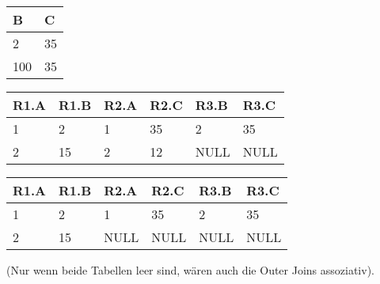 \documentclass{lehramt-informatik-aufgabe}
\begin{document}
\begin{enumerate}
\begin{liAntwort}

\begin{tabular}{|l|l|}
\hline
B   & C  \\ \hline
2   & 35 \\ \hline
100 & 35 \\ \hline
\end{tabular}


\begin{tabular}{|l|l|l|l|l|l|}
\hline
R1.A & R1.B & R2.A & R2.C & R3.B & R3.C \\ \hline
1    & 2    & 1    & 35   & 2    & 35   \\ \hline
2    & 15   & 2    & 12   & NULL & NULL \\ \hline
\end{tabular}


\begin{tabular}{|l|l|l|l|l|l|}
\hline
R1.A & R1.B & R2.A & R2.C & R3.B & R3.C \\ \hline
1    & 2    & 1    & 35   & 2    & 35   \\ \hline
2    & 15   & NULL & NULL & NULL & NULL \\ \hline
\end{tabular}

(Nur wenn beide Tabellen leer sind, wären auch die Outer Joins assoziativ).
\end{liAntwort}
\end{enumerate}
\end{document}
